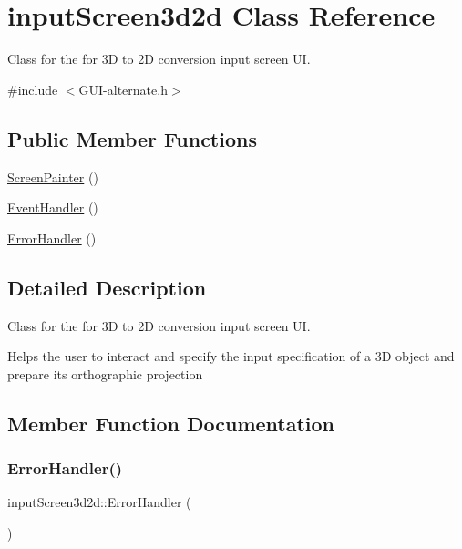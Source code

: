 \hypertarget{classinput_screen3d2d}{}\section{input\+Screen3d2d Class Reference}
\label{classinput_screen3d2d}


Class for the for 3D to 2D conversion input screen UI.  




{\ttfamily \#include $<$G\+U\+I-\/alternate.\+h$>$}

\subsection*{Public Member Functions}
\begin{DoxyCompactItemize}
\item 
\mbox{\hyperlink{classinput_screen3d2d_af0c3df669aff35608d38fd4ef30e31bb}{Screen\+Painter}} ()
\item 
\mbox{\hyperlink{classinput_screen3d2d_a0f023449b6fe3d8b7b981767976129de}{Event\+Handler}} ()
\item 
\mbox{\hyperlink{classinput_screen3d2d_a8ea2645bebe00478695dcbc895c928da}{Error\+Handler}} ()
\end{DoxyCompactItemize}


\subsection{Detailed Description}
Class for the for 3D to 2D conversion input screen UI. 

Helps the user to interact and specify the input specification of a 3D object and prepare its orthographic projection 

\subsection{Member Function Documentation}
\mbox{\label{classinput_screen3d2d_a8ea2645bebe00478695dcbc895c928da}} 
\subsubsection{\texorpdfstring{Error\+Handler()}{ErrorHandler()}}
{\footnotesize\ttfamily input\+Screen3d2d\+::\+Error\+Handler (\begin{DoxyParamCaption}{ }\end{DoxyParamCaption})}

